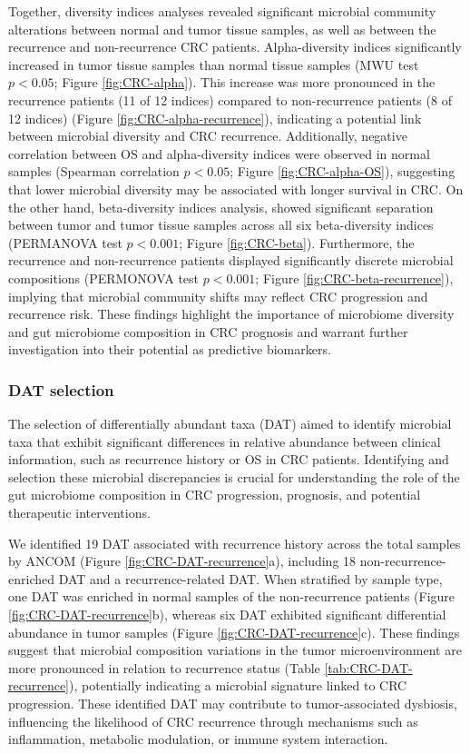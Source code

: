 \documentclass[11pt, a4paper, onecolumn, oneside]{report}
\begin{document}
                Together, diversity indices analyses revealed significant microbial community alterations between normal and tumor tissue samples, as well as between the recurrence and non-recurrence CRC patients. Alpha-diversity indices significantly increased in tumor tissue samples than normal tissue samples (MWU test $p < 0.05$; Figure \ref{fig:CRC-alpha}). This increase was more pronounced in the recurrence patients (11 of 12 indices) compared to non-recurrence patients (8 of 12 indices) (Figure \ref{fig:CRC-alpha-recurrence}), indicating a potential link between microbial diversity and CRC recurrence. Additionally, negative correlation between OS and alpha-diversity indices were observed in normal samples (Spearman correlation $p < 0.05$; Figure \ref{fig:CRC-alpha-OS}), suggesting that lower microbial diversity may be associated with longer survival in CRC. On the other hand, beta-diversity indices analysis, showed significant separation between tumor and tumor tissue samples across all six beta-diversity indices (PERMANOVA test $p < 0.001$; Figure \ref{fig:CRC-beta}). Furthermore, the recurrence and non-recurrence patients displayed significantly discrete microbial compositions (PERMONOVA test $p < 0.001$; Figure \ref{fig:CRC-beta-recurrence}), implying that microbial community shifts may reflect CRC progression and recurrence risk. These findings highlight the importance of microbiome diversity and gut microbiome composition in CRC prognosis and warrant further investigation into their potential as predictive biomarkers.

            \subsubsection{DAT selection}
                The selection of differentially abundant taxa (DAT) aimed to identify microbial taxa that exhibit significant differences in relative abundance between clinical information, such as recurrence history or OS in CRC patients. Identifying and selection these microbial discrepancies is crucial for understanding the role of the gut microbiome composition in CRC progression, prognosis, and potential therapeutic interventions.

                We identified 19 DAT associated with recurrence history across the total samples by ANCOM (Figure \ref{fig:CRC-DAT-recurrence}a), including 18 non-recurrence-enriched DAT and a recurrence-related DAT. When stratified by sample type, one DAT was enriched in normal samples of the non-recurrence patients (Figure \ref{fig:CRC-DAT-recurrence}b), whereas six DAT exhibited significant differential abundance in tumor samples (Figure \ref{fig:CRC-DAT-recurrence}c). These findings suggest that microbial composition variations in the tumor microenvironment are more pronounced in relation to recurrence status (Table \ref{tab:CRC-DAT-recurrence}), potentially indicating a microbial signature linked to CRC progression. These identified DAT may contribute to tumor-associated dysbiosis, influencing the likelihood of CRC recurrence through mechanisms such as inflammation, metabolic modulation, or immune system interaction.
\end{document}
